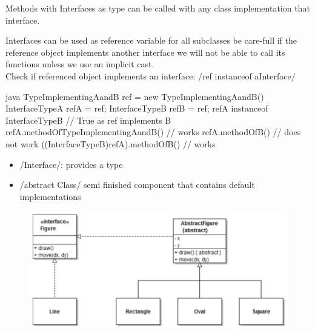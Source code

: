 \begin{notebox}\nospacing
  Methods with Interfaces as type can be called with any class implementation
  that interface.
\end{notebox}
\begin{notebox}\nospacing
  Interfaces can be used as reference variable for all subclasses  be
  care-full if the reference object implements another interface we will not be
  able to call its functions unless we use an implicit cast.\\
  Check if referenced object implements an interface: \javainline/ref instanceof aInterface/
\end{notebox}
\begin{codeboxNl}{java}
  TypeImplementingAandB ref = new TypeImplementingAandB()
  InterfaceTypeA refA = ref;
  InterfaceTypeB refB = ref;
  refA instanceof InterfaceTypeB // True as ref implements B
  refA.methodOfTypeImplementingAandB() // works
  refA.methodOfB() // does not work
  ((InterfaceTypeB)refA).methodOfB() // works
\end{codeboxNl}
\begin{sectionbox}\nospacing
  \begin{itemize}
      \item \javainline/Interface/: provides a type
      \item \javainline/abstract Class/ semi finished component that contains
    default implementations
  \end{itemize}
  \begin{figure}[H]
    \centering
    \includegraphics[width=1.0\textwidth]{java/figures/oop/abstractInterface.png}
  \end{figure}
\end{sectionbox}
